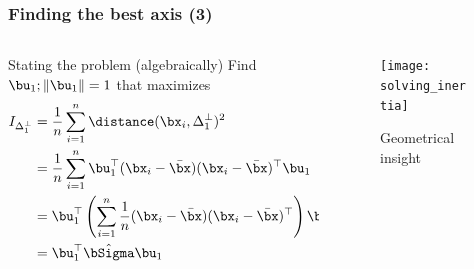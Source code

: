 \documentclass{beamer}\usepackage[]{graphicx}\usepackage[]{color}
\begin{document}
\begin{frame}
  \frametitle{Finding the best axis (3)}

\begin{columns}
  \begin{column}{.5\textwidth}
  \begin{block}{Stating the problem (algebraically)}
    Find $\bu_1; \|\bu_1 \|=1$ that maximizes
    \begin{equation*}
      \begin{aligned}
        I_{\Delta_1^\bot} & = \frac{1}{n}\sum_{i=1}^n \distance(\bx_i,\Delta_1^\bot)^2 \\ 
        & = \frac{1}{n}\sum_{i=1}^n \bu_1^\top (\bx_i - \bar{\bx})(\bx_i - \bar{\bx})^\top \bu_1 \\
        & = \bu_1^\top \left( \sum_{i=1}^n \frac{1}{n}(\bx_i - \bar{\bx})(\bx_i - \bar{\bx})^\top \right)  \bu_1 \\
        & = \bu_1^\top \hat{\bSigma}  \bu_1
      \end{aligned}
    \end{equation*} 
  \end{block}  
  \end{column}
  \begin{column}{.45\textwidth}
  \begin{figure}
    \texttt{[image: solving\_inertia]}
    \caption{Geometrical insight}
  \end{figure}
  \end{column}
\end{columns}
  
\end{frame}
\end{document}
